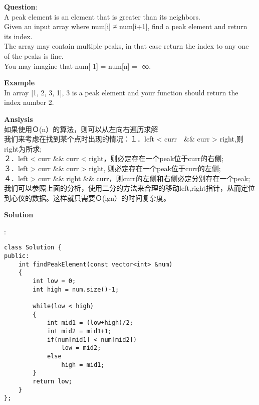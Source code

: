     
\begin{description}
    \item{\textbf{Question}}:\\%
		A peak element is an element that is greater than its neighbors.\\
		Given an input array where num[i] ≠ num[i+1], find a peak element and return its index.\\
		The array may contain multiple peaks, in that case return the index to any one of the peaks is fine.\\
		You may imagine that num[-1] = num[n] = -∞.\\

    \item{\textbf{Example}}\\
		In array [1, 2, 3, 1], 3 is a peak element and your function should return the index number 2.\\

    \item{\textbf{Anslysis}}\\
		如果使用Ｏ(n）的算法，则可以从左向右遍历求解\\
		我们来考虑在找到某个点时出现的情况：１．left < curr　\&\& curr > right,则right为所求;\\
		２．left < curr \&\& curr < right，则必定存在一个peak位于curr的右侧;\\
		３．left > curr \&\& curr > right, 则必定存在一个peak位于curr的左侧;\\
		４．left > curr \&\& right \&\& curr，则curr的左侧和右侧必定分别存在一个peak;\\
		我们可以参照上面的分析，使用二分的方法来合理的移动left,right指针，从而定位到心仪的数据。这样就只需要Ｏ(lgn）的时间复杂度。\\

    \item{\textbf{Solution}}\\
	\item{} : \\
		\begin{lstlisting}
class Solution {
public:
    int findPeakElement(const vector<int> &num) 
    {
        int low = 0;
        int high = num.size()-1;

        while(low < high)
        {
            int mid1 = (low+high)/2;
            int mid2 = mid1+1;
            if(num[mid1] < num[mid2])
                low = mid2;
            else
                high = mid1;
        }
        return low;
    }
};		\end{lstlisting}

\end{description}

